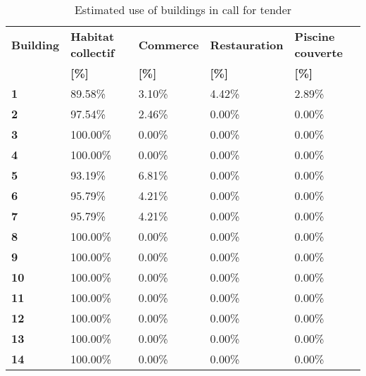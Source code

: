 \begin{table}[h!]
\centering
\caption{Estimated use of buildings in call for tender}\vspace{2mm}
\label{tab:ppa_buildinguse}
\begin{tabular}{lllll}
\toprule
\textbf{Building} & \textbf{Habitat collectif} & \textbf{Commerce} & \textbf{Restauration} & \textbf{Piscine couverte} \\
                  & \textbf{[\%]}               & \textbf{[\%]}      & \textbf{[\%]}          & \textbf{[\%]}              \\
                  \midrule
\textbf{1}        & 89.58\%                     & 3.10\%             & 4.42\%                 & 2.89\%                     \\
\textbf{2}        & 97.54\%                     & 2.46\%             & 0.00\%                 & 0.00\%                     \\
\textbf{3}        & 100.00\%                    & 0.00\%             & 0.00\%                 & 0.00\%                     \\
\textbf{4}        & 100.00\%                    & 0.00\%             & 0.00\%                 & 0.00\%                     \\
\textbf{5}        & 93.19\%                     & 6.81\%             & 0.00\%                 & 0.00\%                     \\
\textbf{6}        & 95.79\%                     & 4.21\%             & 0.00\%                 & 0.00\%                     \\
\textbf{7}        & 95.79\%                     & 4.21\%             & 0.00\%                 & 0.00\%                     \\
\textbf{8}        & 100.00\%                    & 0.00\%             & 0.00\%                 & 0.00\%                     \\
\textbf{9}        & 100.00\%                    & 0.00\%             & 0.00\%                 & 0.00\%                     \\
\textbf{10}       & 100.00\%                    & 0.00\%             & 0.00\%                 & 0.00\%                     \\
\textbf{11}       & 100.00\%                    & 0.00\%             & 0.00\%                 & 0.00\%                     \\
\textbf{12}       & 100.00\%                    & 0.00\%             & 0.00\%                 & 0.00\%                     \\
\textbf{13}       & 100.00\%                    & 0.00\%             & 0.00\%                 & 0.00\%                     \\
\textbf{14}       & 100.00\%                    & 0.00\%             & 0.00\%                 & 0.00\%                    \\
\bottomrule
\end{tabular}
\end{table}